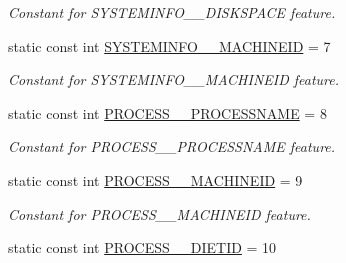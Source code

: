 \begin{DoxyCompactItemize}
\begin{DoxyCompactList}\small\item\em Constant for SYSTEMINFO\_\-\_\-DISKSPACE feature. \item\end{DoxyCompactList}\item 
\hypertarget{classIMS__Data_1_1IMS__DataPackage_a06526ce5245022de80b88643983facac}{
static const int \hyperlink{classIMS__Data_1_1IMS__DataPackage_a06526ce5245022de80b88643983facac}{SYSTEMINFO\_\-\_\-MACHINEID} = 7}
\label{classIMS__Data_1_1IMS__DataPackage_a06526ce5245022de80b88643983facac}

\begin{DoxyCompactList}\small\item\em Constant for SYSTEMINFO\_\-\_\-MACHINEID feature. \item\end{DoxyCompactList}\item 
\hypertarget{classIMS__Data_1_1IMS__DataPackage_a6b5e94d2757f4598b376bfc9f6331406}{
static const int \hyperlink{classIMS__Data_1_1IMS__DataPackage_a6b5e94d2757f4598b376bfc9f6331406}{PROCESS\_\-\_\-PROCESSNAME} = 8}
\label{classIMS__Data_1_1IMS__DataPackage_a6b5e94d2757f4598b376bfc9f6331406}

\begin{DoxyCompactList}\small\item\em Constant for PROCESS\_\-\_\-PROCESSNAME feature. \item\end{DoxyCompactList}\item 
\hypertarget{classIMS__Data_1_1IMS__DataPackage_ae74ffbd1f774bb2651d86bc28ba83098}{
static const int \hyperlink{classIMS__Data_1_1IMS__DataPackage_ae74ffbd1f774bb2651d86bc28ba83098}{PROCESS\_\-\_\-MACHINEID} = 9}
\label{classIMS__Data_1_1IMS__DataPackage_ae74ffbd1f774bb2651d86bc28ba83098}

\begin{DoxyCompactList}\small\item\em Constant for PROCESS\_\-\_\-MACHINEID feature. \item\end{DoxyCompactList}\item 
\hypertarget{classIMS__Data_1_1IMS__DataPackage_af1d6e41481b10d7139aba7cda10965d3}{
static const int \hyperlink{classIMS__Data_1_1IMS__DataPackage_af1d6e41481b10d7139aba7cda10965d3}{PROCESS\_\-\_\-DIETID} = 10}
\label{classIMS__Data_1_1IMS__DataPackage_af1d6e41481b10d7139aba7cda10965d3}


\end{DoxyCompactItemize}
